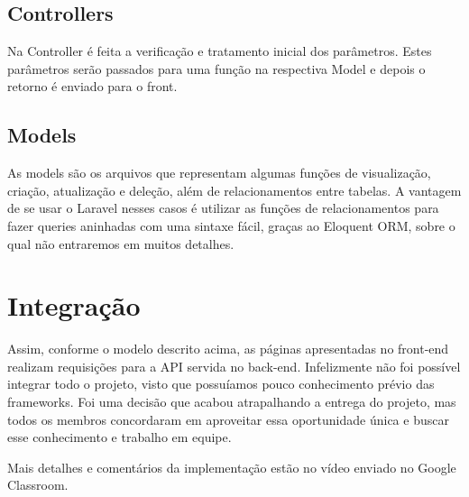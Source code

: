 \documentclass[12pt]{article}
\begin{document}
\subsection{Controllers}

Na Controller é feita a verificação
e tratamento inicial dos parâmetros.
Estes parâmetros serão passados
para uma função na respectiva Model
e depois o retorno é enviado para o front.

\subsection{Models}

As models são os arquivos que representam
algumas funções de visualização, criação,
atualização e deleção, além de relacionamentos
entre tabelas. A vantagem de se usar o Laravel
nesses casos é utilizar as funções
de relacionamentos para fazer queries aninhadas
com uma sintaxe fácil, graças ao Eloquent ORM,
sobre o qual não entraremos em muitos detalhes.

\section{Integração}

Assim, conforme o modelo descrito acima, as páginas
apresentadas no front-end realizam requisições para a API
servida no back-end.
Infelizmente não foi possível integrar todo o projeto,
visto que possuíamos pouco conhecimento
prévio das frameworks. Foi uma decisão que acabou
atrapalhando a entrega do projeto,
mas todos os membros concordaram
em aproveitar essa oportunidade única
e buscar esse conhecimento e trabalho em equipe.

Mais detalhes e comentários da implementação
estão no vídeo enviado no Google Classroom.



\end{document}
